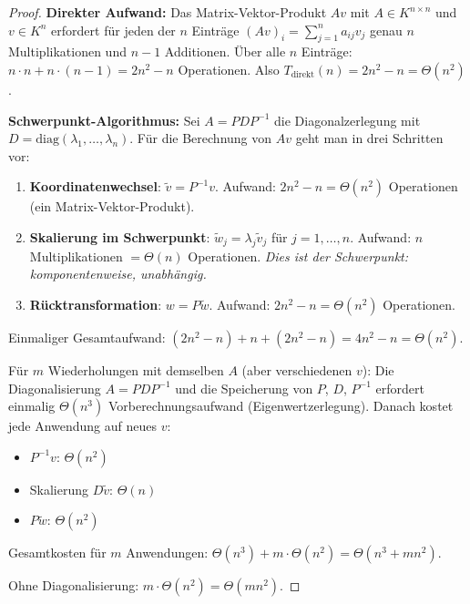 ﻿\documentclass[a4paper,12pt]{report}
\theoremstyle{definition}
\begin{document}
\begin{proof}
    \textbf{Direkter Aufwand:} Das Matrix-Vektor-Produkt $Av$ mit
    $A \in K^{n \times n}$ und $v \in K^n$ erfordert für jeden
    der $n$ Einträge $(Av)_i = \sum_{j=1}^n a_{ij} v_j$ genau
    $n$ Multiplikationen und $n-1$ Additionen. Über alle $n$ Einträge:
    $n \cdot n + n \cdot (n-1) = 2n^2 - n$ Operationen.
    Also $T_{\mathrm{direkt}}(n) = 2n^2 - n = \Theta(n^2)$.

    \textbf{Schwerpunkt-Algorithmus:} Sei $A = P D P^{-1}$ die
    Diagonalzerlegung mit $D = \mathrm{diag}(\lambda_1, \ldots, \lambda_n)$.
    Für die Berechnung von $Av$ geht man in drei Schritten vor:

    \begin{enumerate}
        \item \textbf{Koordinatenwechsel}: $\tilde{v} = P^{-1} v$.
              Aufwand: $2n^2 - n = \Theta(n^2)$ Operationen
              (ein Matrix-Vektor-Produkt).
        \item \textbf{Skalierung im Schwerpunkt}: $\tilde{w}_j = \lambda_j \tilde{v}_j$
              für $j = 1, \ldots, n$.
              Aufwand: $n$ Multiplikationen $= \Theta(n)$ Operationen.
              \emph{Dies ist der Schwerpunkt: komponentenweise, unabhängig.}
        \item \textbf{Rücktransformation}: $w = P \tilde{w}$.
              Aufwand: $2n^2 - n = \Theta(n^2)$ Operationen.
    \end{enumerate}

    Einmaliger Gesamtaufwand: $(2n^2 - n) + n + (2n^2 - n) = 4n^2 - n = \Theta(n^2)$.

    Für $m$ Wiederholungen mit demselben $A$ (aber verschiedenen $v$):
    Die Diagonalisierung $A = PDP^{-1}$ und die Speicherung von
    $P$, $D$, $P^{-1}$ erfordert einmalig $\Theta(n^3)$ Vorberechnungsaufwand
    (Eigenwertzerlegung). Danach kostet jede Anwendung auf neues $v$:
    \begin{itemize}
        \item[-] $P^{-1}v$: $\Theta(n^2)$
        \item[-] Skalierung $D\tilde{v}$: $\Theta(n)$
        \item[-] $P\tilde{w}$: $\Theta(n^2)$
    \end{itemize}
    Gesamtkosten für $m$ Anwendungen:
    $\Theta(n^3) + m \cdot \Theta(n^2) = \Theta(n^3 + mn^2)$.

    Ohne Diagonalisierung: $m \cdot \Theta(n^2) = \Theta(mn^2)$.


\end{proof}
\end{document}
